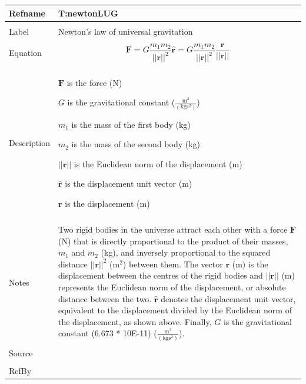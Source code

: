 \documentclass[12pt]{article}
\begin{document}
\noindent \begin{minipage}{\textwidth}
\begin{tabular}{p{} p{}}
\toprule \textbf{Refname} & \textbf{T:newtonLUG}
\label{T:newtonLUG}
\\ \midrule \\
Label & Newton's law of universal gravitation
\\ \midrule \\
Equation & \begin{dmath}
           \mathbf{F}=G \frac{{m_{1}} {m_{2}}}{||\mathbf{r}||^{2}} \mathbf{\hat{r}}=G \frac{{m_{1}} {m_{2}}}{||\mathbf{r}||^{2}} \frac{\mathbf{r}}{||\mathbf{r}||}
           \end{dmath}
\\ \midrule \\
Description & \begin{symbDescription}
              \item{$\mathbf{F}$ is the force (N)}
              \item{$G$ is the gravitational constant ($\frac{\text{m}^{3}}{(\text{kg}\text{s}^{2})}$)}
              \item{${m_{1}}$ is the mass of the first body (kg)}
              \item{${m_{2}}$ is the mass of the second body (kg)}
              \item{$||\mathbf{r}||$ is the Euclidean norm of the displacement (m)}
              \item{$\mathbf{\hat{r}}$ is the displacement unit vector (m)}
              \item{$\mathbf{r}$ is the displacement (m)}
              \end{symbDescription}
\\ \midrule \\
Notes & Two rigid bodies in the universe attract each other with a force $\mathbf{F}$ (N) that is directly proportional to the product of their masses, ${m_{1}}$ and ${m_{2}}$ (kg), and inversely proportional to the squared distance ${||\mathbf{r}||^{2}}$ ($\text{m}^{2}$) between them. The vector $\mathbf{r}$ (m) is the displacement between the centres of the rigid bodies and $||\mathbf{r}||$ (m) represents the Euclidean norm of the displacement, or absolute distance between the two. $\mathbf{\hat{r}}$ denotes the displacement unit vector, equivalent to the displacement divided by the Euclidean norm of the displacement, as shown above. Finally, $G$ is the gravitational constant (6.673 * 10E-11) ($\frac{\text{m}^{3}}{(\text{kg}\text{s}^{2})}$).
\\ \midrule \\
Source & 
\\ \midrule \\
RefBy & 
\\ \bottomrule \end{tabular}
\end{minipage}\\
\end{document}
